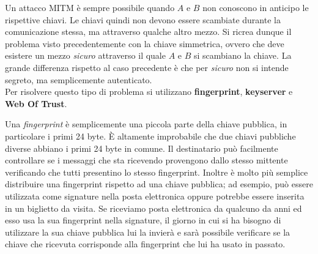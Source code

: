 Un attacco MITM è sempre possibile quando $A$ e $B$ non conoscono in anticipo le rispettive chiavi. Le chiavi quindi non devono essere scambiate durante la comunicazione stessa, ma attraverso qualche altro mezzo. Si ricrea dunque il problema visto precedentemente con la chiave simmetrica, ovvero che deve esistere un mezzo \textit{sicuro} attraverso il quale $A$ e $B$ si scambiano la chiave. La grande differenza rispetto al caso precedente è che per \textit{sicuro} non si intende segreto, ma semplicemente autenticato.\\
Per risolvere questo tipo di problema si utilizzano \textbf{fingerprint}, \textbf{keyserver} e \textbf{Web Of Trust}.

Una \textit{fingerprint} è semplicemente una piccola parte della chiave pubblica, in particolare i primi 24 byte. È altamente improbabile che due chiavi pubbliche diverse abbiano i primi 24 byte in comune. Il destinatario può facilmente controllare se i messaggi che sta ricevendo provengono dallo stesso mittente verificando che tutti presentino lo stesso fingerprint. Inoltre è molto più semplice distribuire una fingerprint rispetto ad una chiave pubblica; ad esempio, può essere utilizzata come signature nella posta elettronica oppure potrebbe essere inserita in un biglietto da visita. Se riceviamo posta elettronica da qualcuno da anni ed esso usa la sua fingerprint nella signature, il giorno in cui si ha bisogno di utilizzare la sua chiave pubblica lui la invierà e sarà possibile verificare se la chiave che ricevuta corrisponde alla fingerprint che lui ha usato in passato.

